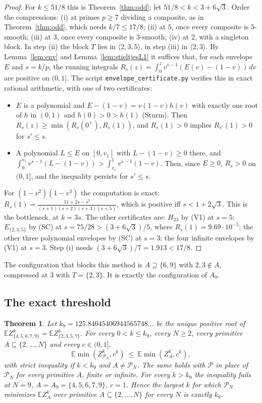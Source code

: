\documentclass[11pt]{article}
\newtheorem{theorem}{Theorem}[section]
\theoremstyle{remark}
\newcommand{\Prm}{\mathcal{P}}
\newcommand{\E}{\mathbb{E}}
\newcommand{\sm}[1]{\langle #1\rangle}
\begin{document}
\begin{proof}
For $k\le51/8$ this is Theorem~\ref{thm:odd}; let $51/8<k<3+6\sqrt3$. Order the compressions:
(i) at primes $p\ge7$ dividing a composite, as in Theorem~\ref{thm:odd}, which needs
$k/7\le17/8$; (ii) at $5$, once every composite is $5$-smooth; (iii) at $3$, once every
composite is $3$-smooth; (iv) at $2$, with a singleton block. In step (ii) the block $T$ lies
in $\sm{2,3,5}$, in step (iii) in $\sm{2,3}$. By Lemma~\ref{lem:env} and Lemma~\ref{lem:stieltjesL1} it suffices
that, for each envelope $E$ and $s=k/p$, the running integrals
$R_s(z)=\int_0^zv^{s-1}(E(v)-(1-v))\,dv$ are positive on $(0,1]$. The script
\texttt{envelope\_certificate.py} verifies this in exact rational arithmetic, with one of two
certificates:
\begin{itemize}
\item[(SC)] $E$ is a polynomial and $E-(1-v)=v(1-v)h(v)$ with exactly one root of $h$ in
$(0,1)$ and $h(0)>0>h(1)$ (Sturm). Then $R_s(z)\ge\min(R_s(0^+),R_s(1))$, and $R_s(1)>0$ implies
$R_{s'}(1)>0$ for $s'\le s$.
\item[(V1)] A polynomial $L\le E$ on $[0,v_1]$ with $L-(1-v)\ge0$ there, and
$\int_0^{v_1}v^{s-1}(L-(1-v))>\int_{v_1}^1v^{s-1}(1-v)$. Then, since $E\ge0$, $R_s>0$ on $(0,1]$,
and the inequality persists for $s'\le s$.
\end{itemize}
For $(1-v^2)(1-v^3)$ the computation is exact:
$R_s(1)=\frac{11+2s-s^2}{(s+1)(s+2)(s+3)(s+5)}$, which is positive iff $s<1+2\sqrt3$. This is
the bottleneck, at $k=3s$. The other certificates are: $H_{23}$ by (V1) at $s=5$;
$E_{\{2,3,5\}}$ by (SC) at $s=75/28>(3+6\sqrt3)/5$, where $R_s(1)=9.69\cdot10^{-5}$; the other three
polynomial envelopes by (SC) at $s=3$; the four infinite envelopes by (V1) at $s=3$. Step (i)
needs $(3+6\sqrt3)/7=1.913<17/8$.
\end{proof}

The configuration that blocks this method is $A\supseteq\{6,9\}$ with $2,3\notin A$, compressed at
$3$ with $T=\{2,3\}$. It is exactly the configuration of $A_9$.

\subsection{The exact threshold}

\begin{theorem}\label{thm:k9}
Let $k_9=125.84045406944565748\ldots$ be the unique positive root of
$\E Z_{\{4,5,6,7,9\}}^k=\E Z_{\{2,3,5,7\}}^k$. For every $0<k\le k_9$, every $N\ge2$, every primitive
$A\subseteq\{2,\dots,N\}$ and every $c\in(0,1]$,
\[
\E\min(Z_{\Prm_N}^k,c^k)\ \le\ \E\min(Z_A^k,c^k),
\]
with strict inequality if $k<k_9$ and $A\ne\Prm_N$. The same holds with $\Prm$ in place of
$\Prm_N$ for every primitive $A$, finite or infinite. For every $k>k_9$ the inequality fails at
$N=9$, $A=A_9=\{4,5,6,7,9\}$, $c=1$. Hence the largest $k$ for which $\Prm_N$ minimizes $\E Z_A^k$
over primitive $A\subseteq\{2,\dots,N\}$ for every $N$ is exactly $k_9$.
\end{theorem}
\end{document}
